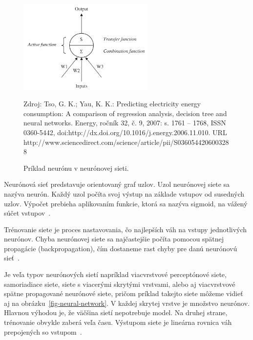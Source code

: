 \documentclass[a4paper,slovak,12pt,appendix]{article}
\newcommand{\source}[1]{\caption*{\footnotesize Zdroj: {#1}} }
\begin{document}
\begin{figure}[!ht]
  \centering
  \includegraphics[width=0.6\textwidth]{neuron.png}
  \caption{Príklad neurónu v neurónovej sieti.}
	\source{Tso, G. K.; Yau, K. K.: Predicting electricity energy consumption:
					A comparison of regression analysis, decision tree and neural
					networks. Energy, ročník 32, č. 9, 2007: s. 1761 – 1768, ISSN 0360-5442,
					doi:http://dx.doi.org/10.1016/j.energy.2006.11.010.
					URL http://www.sciencedirect.com/science/article/pii/S0360544206003288}
  \label{fig-neuron}
\end{figure}

Neurónová sieť predstavuje orientovaný graf uzlov. Uzol neurónovej
siete sa nazýva neurón. Každý uzol počíta svoj výstup na základe vstupov od
susedných uzlov. Výpočet prebieha aplikovaním funkcie, ktorá sa nazýva sigmoid,
na vážený súčet vstupov~\cite{Gruau1994}.

Trénovanie siete je proces nastavovania, čo najlepších váh na vstupy
jednotlivých neurónov. Chyba neurónovej siete sa najčastejšie počíta pomocou
spätnej propagácie (backpropagation), čím dostaneme rast chyby pre danú
neurónovú sieť~\cite{Tso2007}.

Je veľa typov neurónových sietí napríklad viacvrstvové perceptónové siete,
samoriadiace siete, siete s viacerými skrytými vrstvami, alebo aj viacvrstvové
spätne propagované neurónové siete, pričom príklad takejto siete môžeme vidieť
aj na obrázku~\ref{fig-neural-network}. V každej skrytej vrstve je množstvo
neurónov. Hlavnou výhodou je, že väčšina sietí nepotrebuje model. Na druhej strane,
trénovanie obvykle zaberá veľa času. Výstupom siete je lineárna rovnica váh
prepojených so vstupom~\cite{KumarSingh2013}.
\end{document}
